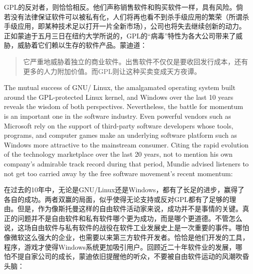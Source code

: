 \ifdefined\chs
GPL的反对者，则恰恰相反。他们声称销售软件和购买软件一样，具有风险。倘若没有法律保证软件可以被私有化，人们将再也看不到杀手级应用的繁荣（所谓杀手级应用，即某种技术足以打开一片全新市场），公司也将失去继续创新的动力。正如蒙迪于五月三日在纽约大学所说的，GPL的“病毒”特性为各大公司带来了威胁，威胁着它们赖以生存的软件产品。蒙迪道：
\begin{quote}
它严重地威胁着独立的商业软件。出售软件不仅仅是要收回发行成本，还有更多的人力附加价值。而GPL则让这种买卖变成天方夜谭。
\end{quote}

\fi

\ifdefined\eng
The mutual success of GNU/ Linux, the amalgamated operating system built around the GPL-protected Linux kernel, and Windows over the last 10 years reveals the wisdom of both perspectives. Nevertheless, the battle for momentum is an important one in the software industry. Even powerful vendors such as Microsoft rely on the support of third-party software developers whose tools, programs, and computer games make an underlying software platform such as Windows more attractive to the mainstream consumer. Citing the rapid evolution of the technology marketplace over the last 20 years, not to mention his own company's admirable track record during that period, Mundie advised listeners to not get too carried away by the free software movement's recent momentum:
\fi

\ifdefined\chs
在过去的10年中，无论是GNU/Linux还是Windows，都有了长足的进步，赢得了各自的成功。两者双赢的局面，似乎使得无论支持或反对GPL都有了足够的理由。但是，作为像斯托曼这样的自由软件活动家来说，成功并不是事情的关键。真正的问题并不是自由软件和私有软件哪个更为成功，而是哪个更道德。不管怎么说，这场自由软件与私有软件的战役在软件工业发展史上是一次重要的事件。哪怕像微软这么强大的企业，也需要以来第三方软件开发者。恰恰是他们开发的工具，程序，游戏才使得Windows系统更加吸引用户。回顾近二十年软件业的发展，哪怕不提自家公司的成长，蒙迪依旧提醒他的听众，不要被自由软件运动的风潮吹昏头脑：
\fi

